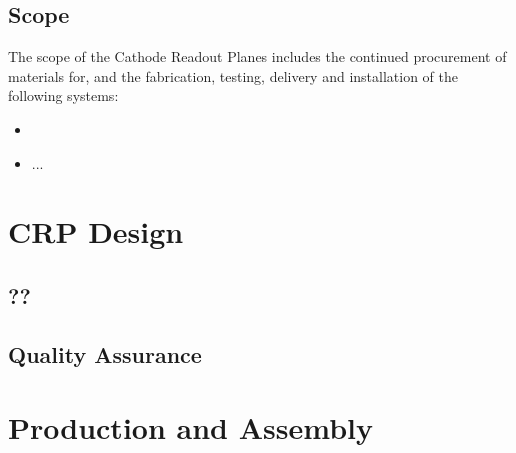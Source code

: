 

\subsection{Scope}
\label{sec:fddp-crp-scope}

The scope of the Cathode Readout Planes includes the continued procurement of materials for, and the fabrication, testing, delivery and installation of the following systems: 


\begin{itemize}
\item  
\item  ...
\end{itemize}



\section{CRP Design}
\label{sec:fddp-crp-design}




\subsection{??}
\label{sec:fddp-crp-??}

\subsection{Quality Assurance}
\label{sec:fddp-crp-qa}




\section{Production and Assembly}
\label{sec:fddp-crp-prod-assy}

\subsection{}
\label{sec:fddp-crp-?}

